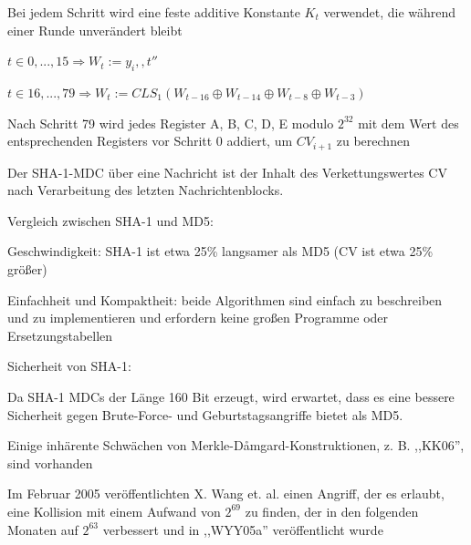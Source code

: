 \documentclass[a4paper]{article}
\begin{document}
\begin{multicols}{3}
\begin{itemize*}
\begin{itemize*}
\begin{itemize*}
                        \item Bei jedem Schritt wird eine feste additive Konstante $K_t$ verwendet, die während einer Runde unverändert bleibt
                  \end{itemize*}
            \end{itemize*}
            \begin{itemize*}
                  \item $t\in{0,...,15}\Rightarrow W_t:= y_i,,t''$
                  \item $t\in{16,...,79}\Rightarrow W_t:=CLS_1(W_{t-16}\oplus W_{t-14}\oplus W_{t-8} \oplus W_{t-3})$
                  \item Nach Schritt 79 wird jedes Register A, B, C, D, E modulo $2^{32}$ mit dem Wert des entsprechenden Registers vor Schritt 0 addiert, um $CV_{i+1}$ zu berechnen
            \end{itemize*}
            \item Der SHA-1-MDC über eine Nachricht ist der Inhalt des Verkettungswertes CV nach Verarbeitung des letzten Nachrichtenblocks.
            \item Vergleich zwischen SHA-1 und MD5:
            \begin{itemize*}
                  \item Geschwindigkeit: SHA-1 ist etwa 25\% langsamer als MD5 (CV ist etwa 25\% größer)
                  \item Einfachheit und Kompaktheit: beide Algorithmen sind einfach zu beschreiben und zu implementieren und erfordern keine großen Programme oder Ersetzungstabellen
            \end{itemize*}
            \item Sicherheit von SHA-1:
            \begin{itemize*}
                  \item Da SHA-1 MDCs der Länge 160 Bit erzeugt, wird erwartet, dass es eine bessere Sicherheit gegen Brute-Force- und Geburtstagsangriffe bietet als MD5.
                  \item Einige inhärente Schwächen von Merkle-Dåmgard-Konstruktionen, z. B. ,,KK06'', sind vorhanden
                  \item Im Februar 2005 veröffentlichten X. Wang et. al. einen Angriff, der es erlaubt, eine Kollision mit einem Aufwand von $2^{69}$ zu finden, der in den folgenden Monaten auf $2^{63}$ verbessert und in ,,WYY05a'' veröffentlicht wurde

\end{itemize*}
\end{itemize*}
\end{multicols}
\end{document}
